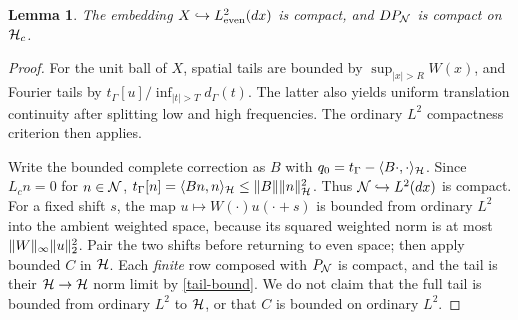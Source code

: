 \documentclass[11pt]{article}
\newtheorem{lemma}[theorem]{Lemma}
\begin{document}
\begin{lemma}\label{embedding}
The embedding $X\hookrightarrow L^2_{\rm even}(dx)$ is compact, and $D P_\mathcal N$ is compact on $\mathcal H_c$.
\end{lemma}
\begin{proof}
For the unit ball of $X$, spatial tails are bounded by $\sup_{|x|>R}W(x)$, and Fourier tails by $t_\Gamma[u]/\inf_{|t|>T}d_\Gamma(t)$. The latter also yields uniform translation continuity after splitting low and high frequencies. The ordinary $L^2$ compactness criterion then applies.

Write the bounded complete correction as $B$ with $q_0=t_\Gamma-\langle B\cdot,\cdot\rangle_{\mathcal H}$. Since $L_c n=0$ for $n\in\mathcal N$, $t_\Gamma[n]=\langle Bn,n\rangle_{\mathcal H}\le\lVert B\rVert\lVert n\rVert_{\mathcal H}^2$. Thus $\mathcal N\hookrightarrow L^2(dx)$ is compact. For a fixed shift $s$, the map $u\mapsto W(\cdot)u(\cdot+s)$ is bounded from ordinary $L^2$ into the ambient weighted space, because its squared weighted norm is at most $\lVert W\rVert_\infty\lVert u\rVert_2^2$. Pair the two shifts before returning to even space; then apply bounded $C$ in $\mathcal H$. Each \emph{finite} row composed with $P_\mathcal N$ is compact, and the tail is their $\mathcal H\to\mathcal H$ norm limit by \eqref{tail-bound}. We do not claim that the full tail is bounded from ordinary $L^2$ to $\mathcal H$, or that $C$ is bounded on ordinary $L^2$.
\end{proof}
\end{document}
